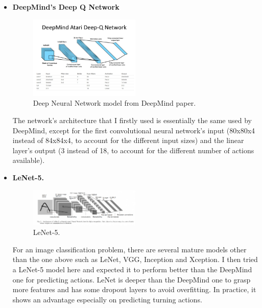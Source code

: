 \documentclass[a4paper]{article}
\begin{document}
\begin{itemize}

	\item \textbf{DeepMind's Deep Q Network}
	
	\begin{figure}[h]
	\centering
	\includegraphics[width=0.5\textwidth]{deepmind-atari-network}
	\caption{Deep Neural Network model from DeepMind paper.}
	\end{figure}
	
	The network's architecture that I firstly used is essentially the same used by DeepMind, except for the first convolutional neural network's input (80x80x4 instead of 84x84x4, to account for the different input sizes) and the linear layer's output (3 instead of 18, to account for the different number of actions available).
	
	\item \textbf{LeNet-5.}
	
	\begin{figure}[h]
	\centering
	\includegraphics[width=0.5\textwidth]{lenet-5-825x285}
	\caption{LeNet-5.}
	\end{figure}
	
	For an image classification problem, there are several mature models other than the one above such as LeNet, VGG, Inception and Xception. I then tried a LeNet-5 model here and expected it to perform better than the DeepMind one for predicting actions. LeNet is deeper than the DeepMind one to grasp more features and has some dropout layers to avoid overfitting. In practice, it shows an advantage especially on predicting turning actions.
	
\end{itemize}

\end{document}
